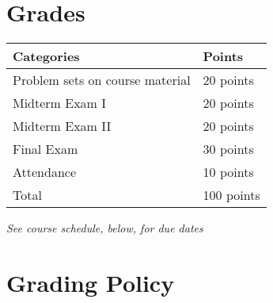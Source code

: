 \documentclass[12pt]{article}
\begin{document}
\newpage

\section*{Grades}

\newlength\q
\setlength{}
\begin{tabular}{|p{\q}|p{\q}|}
    \hline
    Categories  & Points \\
    \hline
    \hline
    Problem sets on course material   & 20 points \\
    \hline
    Midterm Exam I & 20 points \\
    \hline
    Midterm Exam II & 20 points \\
    \hline
    Final Exam & 30 points \\
    \hline
    Attendance & 10 points \\
    \hline
    Total & 100 points \\
    \hline
\end{tabular}
\textit{See course schedule, below, for due dates} \\


\section*{Grading Policy}




\end{document}
